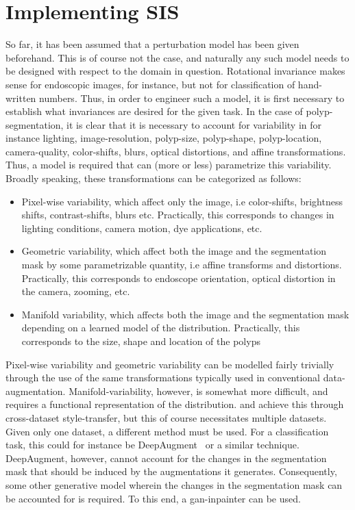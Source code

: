 \section{Implementing SIS}
So far, it has been assumed that a perturbation model has been given beforehand. This is of course not the case, and naturally any such model needs to be designed with respect to the domain in question. Rotational invariance makes sense for endoscopic images, for instance, but not for classification of hand-written numbers. Thus, in order to engineer such a model, it is first necessary to establish what invariances are desired for the given task. In the case of polyp-segmentation, it is clear that it is necessary to account for variability in for instance lighting, image-resolution, polyp-size, polyp-shape, polyp-location, camera-quality, color-shifts, blurs, optical distortions, and affine transformations. Thus, a model is required that can (more or less) parametrize this variability. Broadly speaking, these transformations can be categorized as follows:
\begin{itemize}
    \item Pixel-wise variability, which affect only the image, i.e color-shifts, brightness shifts, contrast-shifts,  blurs etc. Practically, this corresponds to changes in lighting conditions, camera motion, dye applications, etc.
    \item Geometric variability, which affect both the image and the segmentation mask by some parametrizable quantity, i.e affine transforms and distortions. Practically, this corresponds to endoscope orientation, optical distortion in the camera, zooming, etc. 
    \item Manifold variability, which affects both the image and the segmentation mask depending on a learned model of the distribution. Practically, this corresponds to the size, shape and location of the polyps
\end{itemize}
Pixel-wise variability and geometric variability can be modelled fairly trivially through the use of the same transformations typically used in conventional data-augmentation. Manifold-variability, however, is somewhat more difficult, and requires a functional representation of the distribution. \cite{modelbased} and \cite{cyclegan} achieve this through cross-dataset style-transfer, but this of course necessitates multiple datasets. Given only one dataset, a different method must be used. For a classification task, this could for instance be DeepAugment~\cite{deepaugment} or a similar technique. DeepAugment, however, cannot account for the changes in the segmentation mask that should be induced by the augmentations it generates. Consequently, some other generative model wherein the changes in the segmentation mask can be accounted for is required. To this end, a \gls{gan}-inpainter can be used. 

